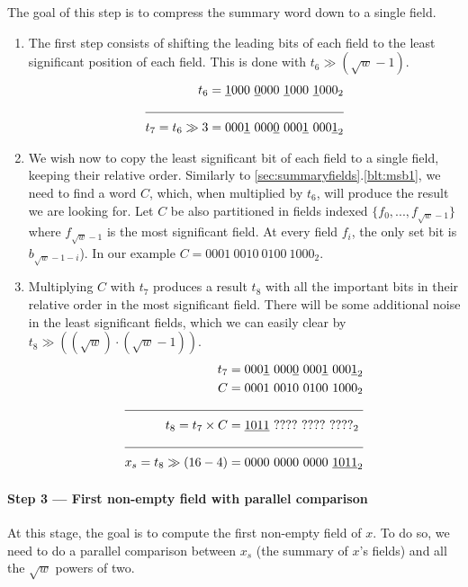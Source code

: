 The goal of this step is to compress the summary word down to a single field.

\begin{enumerate}
    \item \label{blt:summCompression1}
    The first step consists of shifting the leading bits of each field to the least significant position of each field. This is done with $t_6 \gg (\sqrt{w} - 1)$. 
    \begin{align*}
                    t_6 &= \underline{1}000\ \underline{0}000\ \underline{1}000\ \underline{1}000_2 \\ \cline{1-2} 
        t_7 = t_6 \gg 3 &= 000\underline{1}\ 000\underline{0}\ 000\underline{1}\ 000\underline{1}_2
    \end{align*}
    
    \item \label{blt:summCompression2}
    We wish now to copy the least significant bit of each field to a single field, keeping their relative order.
    Similarly to \ref{sec:summaryfields}.\ref{blt:msb1}, we need to find a word $C$, which, when multiplied by $t_6$, will produce the result we are looking for.
    Let $C$ be also partitioned in fields indexed $\{f_0, ..., f_{\sqrt{w} - 1}\}$ where $f_{\sqrt{w} - 1}$ is the most significant field. At every field $f_i$, the only set bit is $b_{\sqrt{w} - 1 - i}$).
    In our example $C = 0001\ 0010\ 0100\ 1000_2$.
    
    \item \label{blt:summCompression3}
    Multiplying $C$ with $t_7$ produces a result $t_8$ with all the important bits in their relative order in the most significant field. There will be some additional noise in the least significant fields, which we can easily clear by $t_8 \gg ((\sqrt{w})\cdot(\sqrt{w} - 1))$.
        \begin{align*}
                         t_7 &= 000\underline{1}\ 000\underline{0}\ 000\underline{1}\ 000\underline{1}_2 \\
                           C &= 0001\ 0010\ 0100\ 1000_2 \\ \cline{1-2} 
          t_8 = t_7 \times C &= \underline{1011}\ ????\ ????\ ????_2\\ \cline{1-2}
        x_s = t_8 \gg (16-4) &= 0000\ 0000\ 0000\ \underline{1011}_2
    \end{align*}
\end{enumerate}

\paragraph{Step 3 --- First non-empty field with parallel comparison} \label{sec:parallel}
At this stage, the goal is to compute the first non-empty field of $x$. To do so, we need to do a parallel comparison between $x_s$ (the summary of $x$'s fields) and all the $\sqrt{w}$ powers of two.

